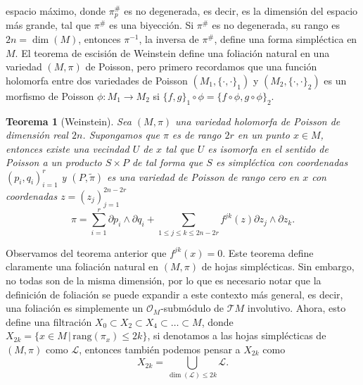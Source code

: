 \documentclass{article}
\newtheorem{teorema}{Teorema}[section]
\begin{document}
espacio m\'aximo, donde $\pi^{\#}_p$ es no degenerada, es decir, es la dimensi\'on del espacio m\'as grande, tal que $\pi^{\#}$ es una
biyecci\'on. Si $\pi^{\#}$ es no degenerada, su rango es $2n=\dim(M)$, entonces $\pi^{-1}$, la inversa de $\pi^{\#}$, define una forma simpl\'ectica
en $M$. El teorema de escisi\'on de Weinstein define una foliaci\'on natural en una variedad $(M,\pi)$ de Poisson, pero primero
recordamos que una funci\'on holomorfa entre dos variedades de Poisson $(M_1,\{\cdot,\cdot\}_1)$ y $(M_2,\{\cdot,\cdot\}_2)$ es un morfismo de Poisson 
$\phi:M_1\rightarrow M_2$ si $\{f,g\}_1\circ\phi=\{f\circ\phi,g\circ\phi\}_2$.
\begin{teorema}[Weinstein]\label{weins}
        Sea $(M,\pi)$ una variedad holomorfa de Poisson de dimensi\'on real $2n$. Supongamos que $\pi$ es de rango $2r$ en un punto $x\in M$, 
        entonces existe una vecindad $U$ de $x$ tal que $U$ es isomorfa en el sentido de Poisson a un producto $S\times P$ de tal forma que $S$ es
        simpl\'ectica con coordenadas $(p_i,q_i)_{i=1}^r$ y $(P,\tilde{\pi})$ es una variedad de Poisson de rango cero en $x$
        con coordenadas $z=(z_j)_{j=1}^{2n-2r}$
        \[
                \pi=\sum_{i=1}^r \partial{p_i}\wedge\partial{q_i}+\sum_{1\leq j\leq k\leq 2n-2r} f^{jk}(z)\partial{z_j}\wedge\partial{z_k}.
        \]
\end{teorema} 
\noindent Observamos del teorema anterior que $f^{jk}(x)=0$. Este teorema define claramente una foliaci\'on natural en $(M,\pi)$ de hojas
simpl\'ecticas. Sin embargo, no todas son de la misma dimensi\'on, por lo que es necesario notar que la definici\'on de foliaci\'on
se puede expandir a este contexto m\'as general, es decir, una foliaci\'on es simplemente un $\mathcal{O}_M$-subm\'odulo de $\mathcal{T}M$ involutivo.
Ahora, esto define una filtraci\'on $X_0\subset X_2\subset X_4\subset\dots\subset M$, donde $X_{2k}=\{x\in M\,|\,\textrm{rang}(\pi_x)\leq 2k\}$,
si denotamos a las hojas simpl\'ecticas de $(M,\pi)$ como $\mathcal{L}$, entonces tambi\'en podemos pensar a $X_{2k}$ como 
$$
X_{2k}=\bigcup_{\dim(\mathcal{L})\leq 2k}\mathcal{L}.
$$
\end{document}
